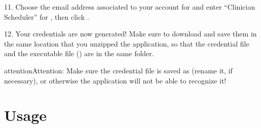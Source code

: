 \documentclass[letterpaper,10pt,english]{sphinxmanual}
\begin{document}
\begin{figure}[htbp]
\centering
{}\end{figure}

\begin{DUlineblock}{0em}
\item[] 
\end{DUlineblock}

11. Choose the email address associated to your account for 
and enter “Clinician Scheduler” for , then
click .

\begin{figure}[htbp]
\centering
{}\end{figure}

\begin{DUlineblock}{0em}
\item[] 
\end{DUlineblock}

12. Your credentials are now generated! Make sure to download and save them
in the same location that you unzipped the application, so that the
credential file and the executable file () are in the same folder.

\begin{figure}[htbp]
\centering
{}\end{figure}

\begin{DUlineblock}{0em}
\item[] 
\end{DUlineblock}

\begin{sphinxadmonition}{attention}{Attention:}
Make sure the credential file is saved as  (rename it, if necessary),
or otherwise the application will not be able to recognize it!
\end{sphinxadmonition}


\chapter{Usage}
\label{\detokenize{index:usage}}
\end{document}
